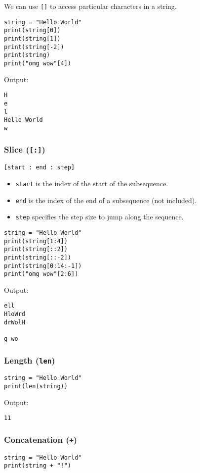 \documentclass[11pt]{article}
\begin{document}
We can use \texttt{[]} to access particular characters in a string.
\begin{verbatim}
string = "Hello World"
print(string[0])
print(string[1])
print(string[-2])
print(string)
print("omg wow"[4])
\end{verbatim}

 \noindent Output:

\begin{verbatim}
H
e
l
Hello World
w
\end{verbatim}


 \newpage

\subsubsection{Slice (\texttt{[:]})}
\label{sec:org44dffcd}
\texttt{[start : end : step]}
\begin{itemize}
\item \texttt{start} is the index of the start of the subsequence.
\item \texttt{end} is the index of the end of a subsequence (not included).
\item \texttt{step} specifies the step size to jump along the sequence.
\end{itemize}

\begin{verbatim}
string = "Hello World"
print(string[1:4])
print(string[::2])
print(string[::-2])
print(string[0:14:-1])
print("omg wow"[2:6])
\end{verbatim}

 \noindent Output:

\begin{verbatim}
ell
HloWrd
drWolH

g wo
\end{verbatim}

\subsubsection{Length (\texttt{len})}
\label{sec:orgeb07bf1}
\begin{verbatim}
string = "Hello World"
print(len(string))
\end{verbatim}

 \noindent Output:

\begin{verbatim}
11
\end{verbatim}

\subsubsection{Concatenation (\texttt{+})}
\label{sec:orge2d523c}
\begin{verbatim}
string = "Hello World"
print(string + "!")
\end{verbatim}
\end{document}
